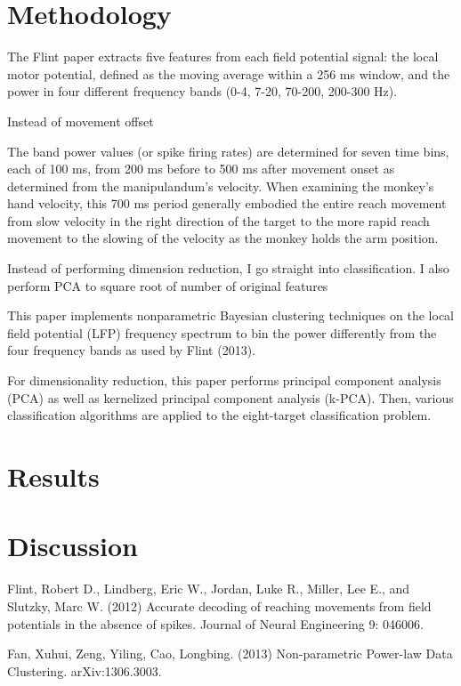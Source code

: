 \documentclass{article}
\begin{document}
\section{Methodology}

The Flint paper\cite{flint} extracts five features from each field potential signal:  the local motor potential, defined as the moving average within a 256 ms window, and the power in four different frequency bands (0-4, 7-20, 70-200, 200-300 Hz).

Instead of movement offset

The band power values (or spike firing rates) are determined for seven time bins, each of 100 ms, from 200 ms before to 500 ms after movement onset as determined from the manipulandum's velocity.  When examining the monkey's hand velocity, this 700 ms period generally embodied the entire reach movement from slow velocity in the right direction of the target to the more rapid reach movement to the slowing of the velocity as the monkey holds the arm position.  


Instead of performing dimension reduction, I go straight into classification.
I also perform PCA to square root of number of original features


This paper implements nonparametric Bayesian clustering techniques on the local field potential (LFP) frequency spectrum to bin the power differently from the four frequency bands as used by Flint (2013).  

For dimensionality reduction, this paper performs principal component analysis (PCA) as well as kernelized principal component analysis (k-PCA).  Then, various classification algorithms are applied to the eight-target classification problem.	


\section{Results}

\section{Discussion}

\begin{thebibliography}{9}

Flint, Robert D., Lindberg, Eric W., Jordan, Luke R., Miller, Lee E., and Slutzky, Marc W. (2012) Accurate decoding of reaching movements from field potentials in the absence of spikes.  Journal of Neural Engineering 9: 046006. 

Fan, Xuhui, Zeng, Yiling, Cao, Longbing. (2013) Non-parametric Power-law Data Clustering.  arXiv:1306.3003.

\end{thebibliography}
\end{document}
